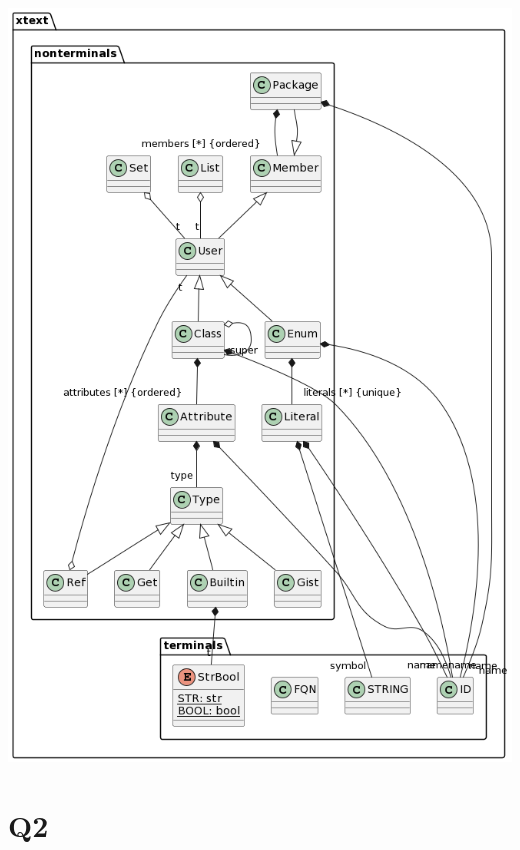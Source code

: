 \documentclass{article}
\begin{document}
\includegraphics[scale=0.6]{xtext-diagram.png}

\section*{Q2}
\end{document}

